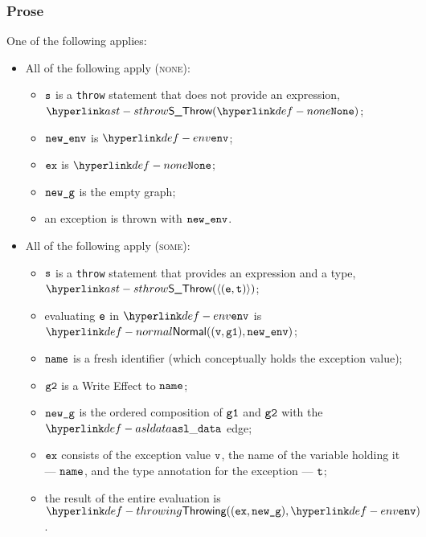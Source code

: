 \subsubsection{Prose}
One of the following applies:
\begin{itemize}
  \item All of the following apply (\textsc{none}):
  \begin{itemize}
  \item $\texttt{s}$ is a \texttt{throw} statement that does not provide an expression, $\SThrow(\None)$;
  \item $\texttt{new\_env}$ is $\env$;
  \item $\texttt{ex}$ is $\None$;
  \item $\texttt{new\_g}$ is the empty graph;
  \item an exception is thrown with $\texttt{new\_env}$.
  \end{itemize}

  \item All of the following apply (\textsc{some}):
  \begin{itemize}
    \item $\texttt{s}$ is a \texttt{throw} statement that provides an expression and a type, \\
          $\SThrow(\langle(\ve, \vt)\rangle)$;
    \item evaluating $\texttt{e}$ in $\env$ is $\Normal((\vv, \vgone), \newenv)$\ProseOrAbnormal;
    \item $\texttt{name}$ is a fresh identifier (which conceptually holds the exception value);
    \item $\texttt{g2}$ is a Write Effect to $\texttt{name}$;
    \item $\texttt{new\_g}$ is the ordered composition of $\texttt{g1}$ and $\texttt{g2}$ with the $\asldata$ edge;
    \item $\texttt{ex}$ consists of the exception value $\texttt{v}$, the name of the variable holding it ---
          $\texttt{name}$, and the type annotation for the exception --- $\texttt{t}$;
    \item the result of the entire evaluation is $\Throwing((\vex, \newg), \env)$.
  \end{itemize}
\end{itemize}
